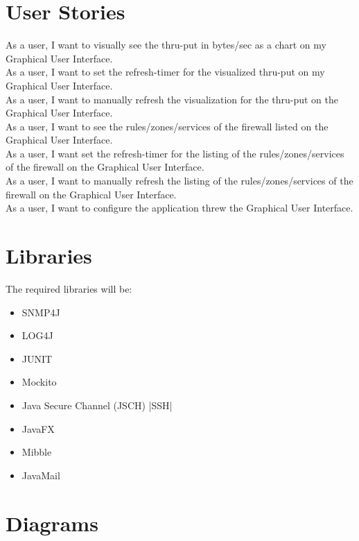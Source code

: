\documentclass[a4paper,12pt]{scrreprt}
\begin{document}
\chapter{User Stories}
As a user, I want to visually see the thru-put in bytes/sec as a chart on my Graphical User Interface.\\

As a user, I want to set the refresh-timer for the visualized thru-put on my Graphical User Interface.\\

As a user, I want to manually refresh the visualization for the thru-put on the Graphical User Interface.\\

As a user, I want to see the rules/zones/services of the firewall listed on the Graphical User Interface.\\

As a user, I want set the refresh-timer for the listing of the rules/zones/services of the firewall on the Graphical User Interface.\\

As a user, I want to manually refresh the listing of the rules/zones/services of the firewall on the Graphical User Interface.\\

As a user, I want to configure the application threw the Graphical User Interface.\\
\chapter{Libraries}
\begin{description}
\item The required libraries will be:
\begin{itemize}
\item SNMP4J
\item LOG4J
\item JUNIT
\item Mockito
\item Java Secure Channel (JSCH) |SSH|
\item JavaFX
\item Mibble
\item JavaMail
\end{itemize}
\end{description}


\chapter{Diagrams}
\end{document}
